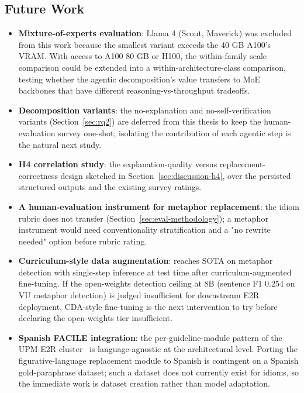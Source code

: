 \subsection{Future Work}
\label{sec:future-work}

\begin{itemize}
    \item \textbf{Mixture-of-experts evaluation}: Llama 4 (Scout, Maverick) was excluded from this work because the smallest variant exceeds the 40 GB A100's VRAM. With access to A100 80 GB or H100, the within-family scale comparison could be extended into a within-architecture-class comparison, testing whether the agentic decomposition's value transfers to MoE backbones that have different reasoning-vs-throughput tradeoffs.
    \item \textbf{Decomposition variants}: the no-explanation and no-self-verification variants (Section~\ref{sec:rq2}) are deferred from this thesis to keep the human-evaluation survey one-shot; isolating the contribution of each agentic step is the natural next study.
    \item \textbf{H4 correlation study}: the explanation-quality versus replacement-correctness design sketched in Section~\ref{sec:discussion-h4}, over the persisted structured outputs and the existing survey ratings.
    \item \textbf{A human-evaluation instrument for metaphor replacement}: the idiom rubric does not transfer (Section~\ref{sec:eval-methodology}); a metaphor instrument would need conventionality stratification and a "no rewrite needed" option before rubric rating.
    \item \textbf{Curriculum-style data augmentation}: \cite{Jia2024} reaches SOTA on metaphor detection with single-step inference at test time after curriculum-augmented fine-tuning. If the open-weights detection ceiling at 8B (sentence F1 0.254 on VU metaphor detection) is judged insufficient for downstream E2R deployment, CDA-style fine-tuning is the next intervention to try before declaring the open-weights tier insufficient.
    \item \textbf{Spanish FACILE integration}: the per-guideline-module pattern of the UPM E2R cluster~\cite{Surez-Figueroa2024,Surez-Figueroa2023} is language-agnostic at the architectural level. Porting the figurative-language replacement module to Spanish is contingent on a Spanish gold-paraphrase dataset; such a dataset does not currently exist for idioms, so the immediate work is dataset creation rather than model adaptation.
\end{itemize}

\newpage
